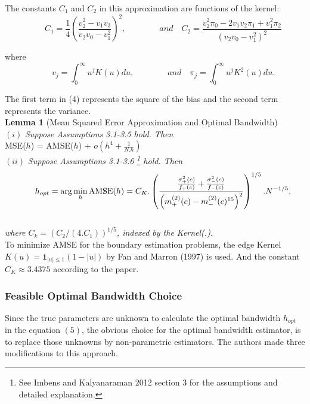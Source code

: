 \documentclass[fleqn]{article}
\begin{document}
    The constants $C_1$ and $C_2$ in this approximation are functions of the kernel:\\
    \begin{equation*}
        \qquad C_1 = \frac{1}{4} \left(\frac{v^2_2 - v_1v_3}{v_2v_0 - v^2_1} \right)^2, \qquad \qquad and \quad C_2 = \frac{v^2_2\pi_0 - 2v_1v_2\pi_1 + v^2_1\pi_2}{\left( v_2v_0-v^2_1 \right)^2}
    \end{equation*}

    where
    \begin{equation*}
        \qquad v_j = \int^\infty_0 u^jK(u)du, \qquad \qquad and \quad \pi_j = \int^\infty_0 u^j K^2(u)du.
    \end{equation*}

    The first term in (4) represents the square of the bias and the second term represents the variance. \\

    \textbf{Lemma 1} (Mean Squared Error Approximation and Optimal Bandwidth) \\

    $(i)$ \textit{Suppose Assumptions 3.1-3.5 hold. Then} \\

    \qquad MSE($h$) = AMSE($h$) + $o \left(h^4 + \frac{1}{N.h} \right)$ \\

    $(ii)$ \textit{Suppose Assumptions 3.1-3.6 \footnote{See Imbens and Kalyanaraman 2012\cite{imbens2012optimal} section 3 for the assumptions and detailed explanation.} hold. Then} \\
    \begin{equation}
        \qquad h_{opt} = \arg\min_{h} \text{AMSE}(h) = C_K.\left(\frac{\frac{\sigma^2_+(c)}{f_+(c)} + \frac{\sigma^2_-(c)}{f_-(c)}}{\left( m^{(2)}_+(c) - m^{(2)}_-(c) \footnotemark[15] \right)^2} \right)^ {1/5}.N^{-1/5},
    \end{equation} \\

    \textit{where $C_k = \left(C_2/\left(4.C_1 \right)\right)^{1/5}$, indexed by the Kernel(.).} \\

    To minimize AMSE for the boundary estimation problems, the edge Kernel $K(u)= \textbf{1}_{|u| \le 1} \left(1 - |u|\right)$ by Fan and Marron (1997)\cite{cheng1997automatic} is used. And the constant $C_K \approx 3.4375 $ according to the paper\cite{imbens2012optimal}.

    \subsubsection{Feasible Optimal Bandwidth Choice}
    Since the true parameters are unknown to calculate the optimal bandwidth $h_{opt}$ in the equation $(5)$, the obvious choice for the optimal bandwidth estimator, is to replace those unknowns by non-parametric estimators. The authors made three modifications to this approach.
\end{document}
